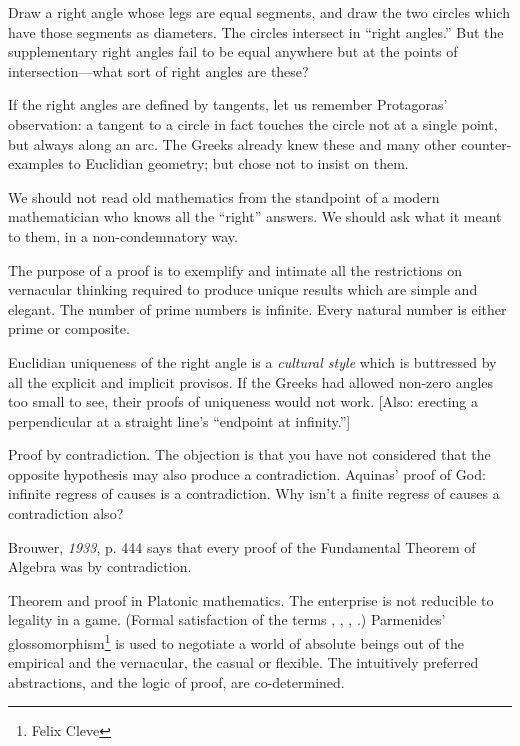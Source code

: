Draw a right angle whose legs are equal segments, and draw the two circles which have those segments as diameters. The circles intersect in \enquote{right angles.} But the supplementary right angles fail to be equal anywhere but at the points of intersection---what sort of right angles are these?

If the right angles are defined by tangents, let us remember Protagoras' observation: a tangent to a circle in fact touches the circle not at a single point, but always along an arc. The Greeks already knew these and many other counter-examples to Euclidian geometry; but chose not to insist on them.

We should not read old mathematics from the standpoint of a modern mathematician who knows all the \enquote{right} answers. We should ask what it meant to them, in a non-condemnatory way.

The purpose of a proof is to exemplify and intimate all the restrictions on vernacular thinking required to produce unique results which are simple and elegant. The number of prime numbers is infinite. Every natural number is either prime or composite.

Euclidian uniqueness of the right angle is a \textit{cultural style} which is buttressed by all the explicit and implicit provisos. If the Greeks had allowed non-zero angles too small to see, their proofs of uniqueness would not work. [Also: erecting a perpendicular at a straight line's \enquote{endpoint at infinity.}]

Proof by contradiction. The objection is that you have not considered that the opposite hypothesis may also produce a contradiction. Aquinas' proof of God: infinite regress of causes is a contradiction. Why isn't a finite regress of causes a contradiction also?

Brouwer, \textit{1933}, p. 444 says that every proof of the Fundamental Theorem of Algebra was by contradiction.

Theorem and proof in Platonic mathematics. The enterprise is not reducible to legality in a game. (Formal satisfaction of the terms , , , .) Parmenides' glossomorphism\footnote{Felix Cleve} is used to negotiate a world of absolute beings out of the empirical and the vernacular, the casual or flexible. The intuitively preferred abstractions, and the logic of proof, are co-determined.

